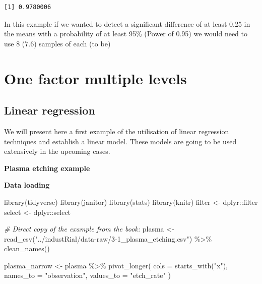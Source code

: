 \documentclass[
]{book}
\newenvironment{Shaded}{\begin{snugshade}}{\end{snugshade}}
\newcommand{\AttributeTok}[1]{\textcolor[rgb]{0.77,0.63,0.00}{#1}}
\newcommand{\CommentTok}[1]{\textcolor[rgb]{0.56,0.35,0.01}{\textit{#1}}}
\newcommand{\FunctionTok}[1]{\textcolor[rgb]{0.00,0.00,0.00}{#1}}
\newcommand{\NormalTok}[1]{#1}
\newcommand{\OtherTok}[1]{\textcolor[rgb]{0.56,0.35,0.01}{#1}}
\newcommand{\SpecialCharTok}[1]{\textcolor[rgb]{0.00,0.00,0.00}{#1}}
\newcommand{\StringTok}[1]{\textcolor[rgb]{0.31,0.60,0.02}{#1}}
\begin{document}
\begin{verbatim}
[1] 0.9780006
\end{verbatim}

In this example if we wanted to detect a significant difference of at least 0.25 in the means with a probability of at least 95\% (Power of 0.95) we would need to use 8 (7.6) samples of each (to be)

\hypertarget{one-factor-multiple-levels}{%
\section{One factor multiple levels}\label{one-factor-multiple-levels}}

\hypertarget{linear-regression}{%
\subsection{Linear regression}\label{linear-regression}}

We will present here a first example of the utilisation of linear regression techniques and establish a linear model. These models are going to be used extensively in the upcoming cases.

\textbf{Plasma etching example}

\textbf{Data loading}

\begin{Shaded}
\begin{Highlighting}[]
\FunctionTok{library}\NormalTok{(tidyverse)}
\FunctionTok{library}\NormalTok{(janitor)}
\FunctionTok{library}\NormalTok{(stats)}
\FunctionTok{library}\NormalTok{(knitr)}
\NormalTok{filter }\OtherTok{\textless{}{-}}\NormalTok{ dplyr}\SpecialCharTok{::}\NormalTok{filter}
\NormalTok{select }\OtherTok{\textless{}{-}}\NormalTok{ dplyr}\SpecialCharTok{::}\NormalTok{select}
\end{Highlighting}
\end{Shaded}

\begin{Shaded}
\begin{Highlighting}[]
\CommentTok{\# Direct copy of the example from the book:}
\NormalTok{plasma }\OtherTok{\textless{}{-}} \FunctionTok{read\_csv}\NormalTok{(}\StringTok{"../industRial/data{-}raw/3{-}1\_plasma\_etching.csv"}\NormalTok{) }\SpecialCharTok{\%\textgreater{}\%}
  \FunctionTok{clean\_names}\NormalTok{()}

\NormalTok{plasma\_narrow }\OtherTok{\textless{}{-}}\NormalTok{ plasma }\SpecialCharTok{\%\textgreater{}\%}
  \FunctionTok{pivot\_longer}\NormalTok{(}
    \AttributeTok{cols =} \FunctionTok{starts\_with}\NormalTok{(}\StringTok{"x"}\NormalTok{),}
    \AttributeTok{names\_to =} \StringTok{"observation"}\NormalTok{,}
    \AttributeTok{values\_to =} \StringTok{"etch\_rate"}
\NormalTok{  )}
\end{Highlighting}
\end{Shaded}
\end{document}
